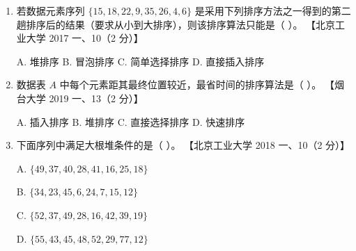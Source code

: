 \documentclass[lang=cn,newtx,10pt,scheme=chinese]{../../elegantbook}
\begin{document}
\begin{enumerate}
    \item 若数据元素序列 $\{15, 18, 22, 9, 35, 26, 4, 6\}$ 是采用下列排序方法之一得到的第二趟排序后的结果（要求从小到大排序），则该排序算法只能是（ ）。  
    【北京工业大学 2017 一、10（2 分）】  

    A. 堆排序 \quad B. 冒泡排序 \quad C. 简单选择排序 \quad D. 直接插入排序  

    \item 数据表 $A$ 中每个元素距其最终位置较近，最省时间的排序算法是（ ）。  
    【烟台大学 2019 一、13（2 分）】  

    A. 插入排序 \quad B. 堆排序 \quad C. 直接选择排序 \quad D. 快速排序 

    \item 下面序列中满足大根堆条件的是（ ）。  
    【北京工业大学 2018 一、10（2 分）】  

    A. $\{49, 37, 40, 28, 41, 16, 25, 18\}$  

    B. $\{34, 23, 45, 6, 24, 7, 15, 12\}$  

    C. $\{52, 37, 49, 28, 16, 42, 39, 19\}$  

    D. $\{55, 43, 45, 48, 52, 29, 77, 12\}$  
\end{enumerate}
\end{document}
